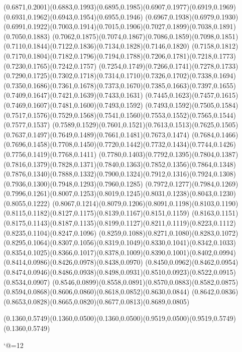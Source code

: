 (0.6871,0.2001)(0.6883,0.1993)(0.6895,0.1985)(0.6907,0.1977)(0.6919,0.1969)(0.6931,0.1962)(0.6943,0.1954)(0.6955,0.1946)
(0.6967,0.1938)(0.6979,0.1930)(0.6991,0.1922)(0.7003,0.1914)(0.7015,0.1906)(0.7027,0.1899)(0.7038,0.1891)(0.7050,0.1883)
(0.7062,0.1875)(0.7074,0.1867)(0.7086,0.1859)(0.7098,0.1851)(0.7110,0.1844)(0.7122,0.1836)(0.7134,0.1828)(0.7146,0.1820)
(0.7158,0.1812)(0.7170,0.1804)(0.7182,0.1796)(0.7194,0.1788)(0.7206,0.1781)(0.7218,0.1773)(0.7230,0.1765)(0.7242,0.1757)
(0.7254,0.1749)(0.7266,0.1741)(0.7278,0.1733)(0.7290,0.1725)(0.7302,0.1718)(0.7314,0.1710)(0.7326,0.1702)(0.7338,0.1694)
(0.7350,0.1686)(0.7361,0.1678)(0.7373,0.1670)(0.7385,0.1663)(0.7397,0.1655)(0.7409,0.1647)(0.7421,0.1639)(0.7433,0.1631)
(0.7445,0.1623)(0.7457,0.1615)(0.7469,0.1607)(0.7481,0.1600)(0.7493,0.1592)
\PST@Solid(0.7493,0.1592)(0.7505,0.1584)(0.7517,0.1576)(0.7529,0.1568)(0.7541,0.1560)(0.7553,0.1552)(0.7565,0.1544)(0.7577,0.1537)
(0.7589,0.1529)(0.7601,0.1521)(0.7613,0.1513)(0.7625,0.1505)(0.7637,0.1497)(0.7649,0.1489)(0.7661,0.1481)(0.7673,0.1474)
(0.7684,0.1466)(0.7696,0.1458)(0.7708,0.1450)(0.7720,0.1442)(0.7732,0.1434)(0.7744,0.1426)(0.7756,0.1419)(0.7768,0.1411)
(0.7780,0.1403)(0.7792,0.1395)(0.7804,0.1387)(0.7816,0.1379)(0.7828,0.1371)(0.7840,0.1363)(0.7852,0.1356)(0.7864,0.1348)
(0.7876,0.1340)(0.7888,0.1332)(0.7900,0.1324)(0.7912,0.1316)(0.7924,0.1308)(0.7936,0.1300)(0.7948,0.1293)(0.7960,0.1285)
(0.7972,0.1277)(0.7984,0.1269)(0.7996,0.1261)(0.8007,0.1253)(0.8019,0.1245)(0.8031,0.1238)(0.8043,0.1230)(0.8055,0.1222)
(0.8067,0.1214)(0.8079,0.1206)(0.8091,0.1198)(0.8103,0.1190)(0.8115,0.1182)(0.8127,0.1175)(0.8139,0.1167)(0.8151,0.1159)
(0.8163,0.1151)(0.8175,0.1143)(0.8187,0.1135)(0.8199,0.1127)(0.8211,0.1119)(0.8223,0.1112)(0.8235,0.1104)(0.8247,0.1096)
(0.8259,0.1088)(0.8271,0.1080)(0.8283,0.1072)(0.8295,0.1064)(0.8307,0.1056)(0.8319,0.1049)(0.8330,0.1041)(0.8342,0.1033)
(0.8354,0.1025)(0.8366,0.1017)(0.8378,0.1009)(0.8390,0.1001)(0.8402,0.0994)(0.8414,0.0986)(0.8426,0.0978)(0.8438,0.0970)
(0.8450,0.0962)(0.8462,0.0954)(0.8474,0.0946)(0.8486,0.0938)(0.8498,0.0931)(0.8510,0.0923)(0.8522,0.0915)(0.8534,0.0907)
(0.8546,0.0899)(0.8558,0.0891)(0.8570,0.0883)(0.8582,0.0875)(0.8594,0.0868)(0.8606,0.0860)(0.8618,0.0852)(0.8630,0.0844)
(0.8642,0.0836)(0.8653,0.0828)(0.8665,0.0820)(0.8677,0.0813)(0.8689,0.0805)



\PST@Solid(0.1360,0.5749)(0.1360,0.0500)\PST@Solid(0.1360,0.0500)(0.9519,0.0500)(0.9519,0.5749)(0.1360,0.5749)

\catcode`@=12
\fi
\endpspicture
